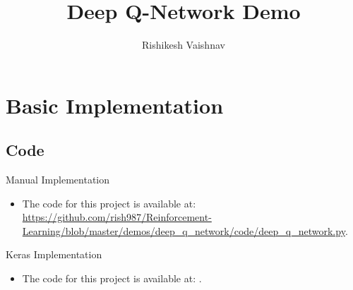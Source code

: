 \documentclass[a4paper]{article}
\title{Deep Q-Network Demo}
\author{Rishikesh Vaishnav}
\begin{document}
\maketitle
\section*{Basic Implementation}
\subsection*{Code}
Manual Implementation
\begin{itemize}
    \item The code for this project is available at: 
    \url{https://github.com/rish987/Reinforcement-Learning/blob/master/demos/deep_q_network/code/deep_q_network.py}.
\end{itemize}
Keras Implementation
\begin{itemize}
    \item The code for this project is available at: 
    \url{}.
\end{itemize}
\end{document}
